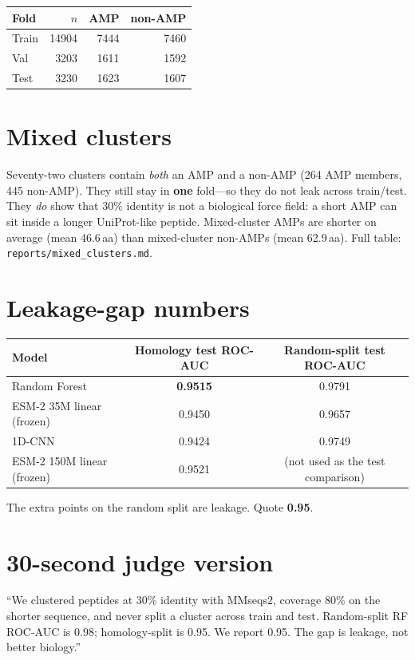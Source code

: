\documentclass[11pt,a4paper]{report}
\begin{document}
\begin{tabular}{lrrr}
\toprule
Fold & $n$ & AMP & non-AMP \\
\midrule
Train & 14904 & 7444 & 7460 \\
Val & 3203 & 1611 & 1592 \\
Test & 3230 & 1623 & 1607 \\
\bottomrule
\end{tabular}

\section{Mixed clusters}

Seventy-two clusters contain \emph{both} an AMP and a non-AMP (264 AMP members, 445 non-AMP). They still stay in \textbf{one} fold---so they do not leak across train/test. They \emph{do} show that 30\% identity is not a biological force field: a short AMP can sit inside a longer UniProt-like peptide. Mixed-cluster AMPs are shorter on average (mean 46.6\,aa) than mixed-cluster non-AMPs (mean 62.9\,aa). Full table: \texttt{reports/mixed\_clusters.md}.

\section{Leakage-gap numbers}

\begin{tabular}{lcc}
\toprule
Model & Homology test ROC-AUC & Random-split test ROC-AUC \\
\midrule
Random Forest & \textbf{0.9515} & 0.9791 \\
ESM-2 35M linear (frozen) & 0.9450 & 0.9657 \\
1D-CNN & 0.9424 & 0.9749 \\
ESM-2 150M linear (frozen) & 0.9521 & (not used as the test comparison) \\
\bottomrule
\end{tabular}

The extra points on the random split are leakage. Quote \textbf{0.95}.

\section{30-second judge version}

``We clustered peptides at 30\% identity with MMseqs2, coverage 80\% on the shorter sequence, and never split a cluster across train and test. Random-split RF ROC-AUC is 0.98; homology-split is 0.95. We report 0.95. The gap is leakage, not better biology.''
\end{document}
